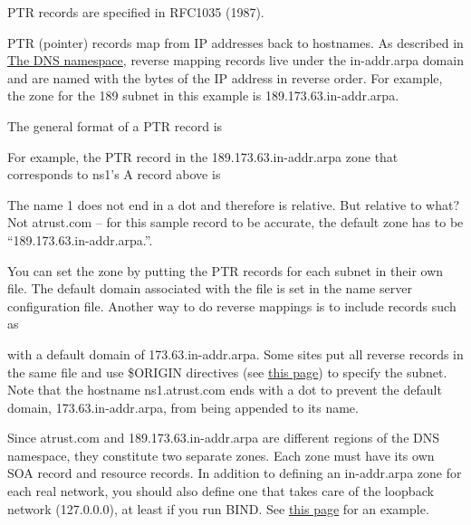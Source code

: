 \leavevmode\hypertarget{part0024_split_026.htmlux5cux23_idContainer947}{}%
\protect\hypertarget{part0024_split_026.htmlux5cux23_idTextAnchor880}{}{}PTR
records are specified in RFC1035 (1987).

PTR (pointer) records
\protect\hypertarget{part0024_split_026.htmlux5cux23_idIndexMarker2082}{}{}map
from IP addresses back to hostnames. As described in
\protect\hyperlink{part0024_split_007.htmlux5cux23_idTextAnchor849}{{The
DNS namespace}},
\protect\hypertarget{part0024_split_026.htmlux5cux23_idIndexMarker2083}{}{}reverse
mapping records live under the in-addr.arpa domain and are named with
the bytes of the IP address in reverse order.
\protect\hypertarget{part0024_split_026.htmlux5cux23_idIndexMarker2084}{}{}For
example, the zone for the 189 subnet in this example is
189.173.63.in-addr.arpa.

The general format of a PTR record is


For example, the PTR record in the
189.173.63.\protect\hypertarget{part0024_split_026.htmlux5cux23_idIndexMarker2085}{}{}\protect\hypertarget{part0024_split_026.htmlux5cux23_idIndexMarker2086}{}{}in-addr.arpa
zone that corresponds to ns1's A record above is


The name 1 does not end in a dot and therefore is relative. But relative
to what? Not atrust.com -- for this sample record to be accurate, the
default zone has to be ``189.173.63.in-addr.arpa.''.

\protect\hypertarget{part0024_split_026.htmlux5cux23_idIndexMarker2087}{}{}You
can set the zone by putting the PTR records for each subnet in their own
file. The default domain associated with the file is set in the name
server configuration file. Another way to do reverse mappings is to
include records such as


with a default domain of 173.63.in-addr.arpa. Some sites put all reverse
records in the same file and use {\$ORIGIN} directives (see
\protect\hyperlink{part0024_split_020.htmlux5cux23_idTextAnchor867}{this
page}) to specify the subnet. Note that the hostname ns1.atrust.com ends
with a dot to prevent the default domain, 173.63.in-addr.arpa, from
being appended to its name.

Since atrust.com and 189.173.63.in-addr.arpa are different regions of
the DNS namespace, they constitute two separate zones. Each zone must
have its own SOA record and resource records. In addition to defining an
in-addr.arpa zone for each real network, you should also define one that
takes care of the loopback network (127.0.0.0), at least if you run
BIND. See
\protect\hyperlink{part0024_split_048.htmlux5cux23_idTextAnchor924}{this
page} for an example.


